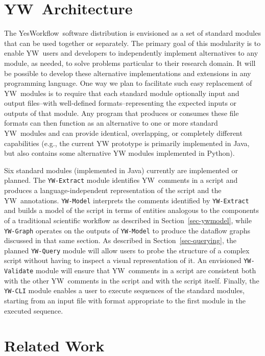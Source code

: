 \documentclass{article}
\newcommand{\YW}{\textsf{YesWorkflow}}
\newcommand{\yw}{\textsf{YW}}
\newcommand{\ywt}{\textsf{YW}}
\newcommand{\ywm}[1]{\texttt{#1}}
\begin{document}
\section{\ywt\ Architecture}

The \YW\ software distribution is envisioned as a set of standard
modules that can be used together or separately. The primary goal
of this modularity is to enable \yw\ users and developers
to independently implement alternatives to any module, as needed, to
solve problems particular to their research domain. It will be
possible to develop these alternative implementations and extensions
in any programming language.  One way we plan to facilitate such easy
replacement of \yw\ modules is to require that each standard module
optionally input and output files--with well-defined
formats--representing the expected inputs or outputs of that
module. Any program that produces or consumes these file formats can
then function as an alternative to one or more standard \yw\ modules
and can provide identical, overlapping, or completely different
capabilities (e.g., the current \textsf{YW} prototype is primarily
implemented in Java, but also contains some alternative \textsf{YW}
modules implemented in Python).

Six standard modules (implemented in Java) currently are implemented
or planned. The \ywm{YW-Extract} module identifies \yw\ comments in a
script and produces a language-independent representation of the
script and the \yw\ annotations. \ywm{YW-Model} interprets the comments
identified by \ywm{YW-Extract} and builds a model of the script in
terms of entities analogous to the components of a traditional
scientific workflow as described in Section~\ref{sec-ywmodel}, while
\ywm{YW-Graph} operates on the outputs of \ywm{YW-Model} to produce
the dataflow graphs discussed in that same section. As described in
Section~\ref{sec-querying}, the planned \ywm{YW-Query} module will
allow users to probe the structure of a complex script without having
to inspect a visual representation of it. An envisioned
\ywm{YW-Validate} module will ensure that \yw\ comments in a script
are consistent both with the other \yw\ comments in the script and
with the script itself. Finally, the \ywm{YW-CLI} module enables a
user to execute sequences of the standard modules, starting from an
input file with format appropriate to the first module in the executed
sequence.


\section{Related Work}
\end{document}
